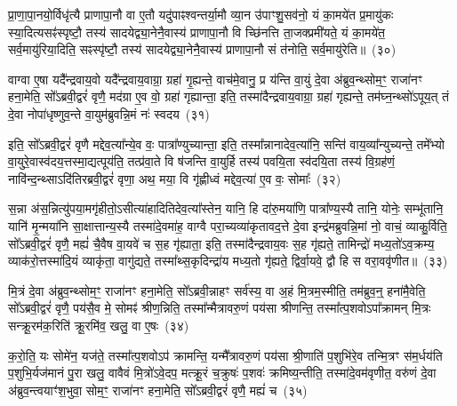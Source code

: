 प्रा॒णा॒पा॒नयो॒र्विधृ॑त्यै प्राणापा॒नौ वा ए॒तौ यदु॑पाꣴश्वन्तर्या॒मौ व्या॒न उ॑पाꣳशु॒सव॑नो॒ यं का॒मये॑त प्र॒मायु॑कः स्या॒दित्यसꣴ॑स्पृष्टौ॒ तस्य॑ सादयेद्व्या॒नेनै॒वास्य॑ प्राणापा॒नौ वि च्छि॑नत्ति ता॒जक्प्रमी॑यते॒ यं का॒मये॑त॒ सर्व॒मायु॑रिया॒दिति॒ सꣴस्पृ॑ष्टौ॒ तस्य॑ सादयेद्व्या॒नेनै॒वास्य॑ प्राणापा॒नौ सं त॑नोति॒ सर्व॒मायु॑रेति॥~(३०)\ip

{\anuvakamend[{त॒ उ॒भया᳚न्गृह्यते॒ चतु॑श्चत्वारिꣳशच्च}]}

वाग्वा ए॒षा यदै᳚न्द्रवाय॒वो यदै᳚न्द्रवाय॒वाग्रा॒ ग्रहा॑ गृ॒ह्यन्ते॒ वाच॑मे॒वानु॒ प्र य॑न्ति वा॒युं दे॒वा अ॑ब्रुव॒न्थ्सोम॒ꣳ॒ राजा॑नꣳ हना॒मेति॒ सो᳚\-ऽब्रवी॒द्वरं॑ वृणै॒ मद॑ग्रा ए॒व वो॒ ग्रहा॑ गृह्यान्ता॒ इति॒ तस्मा॑दैन्द्रवाय॒वाग्रा॒ ग्रहा॑ गृह्यन्ते॒ तम॑घ्न॒न्थ्सो॑\-ऽपूय॒त् तं दे॒वा नोपा॑धृष्णुव॒न्ते वा॒युम॑ब्रुवन्नि॒मं नः॑ स्वदय~(३१)\ip

इति॒ सो᳚\-ऽब्रवी॒द्वरं॑ वृणै मद्देव॒त्या᳚न्ये॒व वः॒ पात्रा᳚ण्युच्यान्ता॒ इति॒ तस्मा᳚न्नानादेव॒त्या॑नि॒ सन्ति॑ वाय॒व्या᳚न्युच्यन्ते॒ तमे᳚भ्यो वा॒युरे॒वास्व॑दय॒त्तस्मा॒द्यत्पूय॑ति॒ तत्प्र॑वा॒ते वि ष॑जन्ति वा॒युर्\mbox{}हि तस्य॑ पवयि॒ता स्व॑दयि॒ता तस्य॑ वि॒ग्रह॑णं॒ नावि॑न्द॒न्थ्सा\-ऽदि॑तिरब्रवी॒द्वरं॑ वृणा॒ अथ॒ मया॒ वि गृ॑ह्णीध्वं मद्देव॒त्या॑ ए॒व वः॒ सोमाः᳚~(३२)\ip

स॒न्ना अ॑स॒न्नित्यु॑पया॒मगृ॑हीतो॒\-ऽसीत्या॑हादितिदेव॒त्या᳚स्तेन॒ यानि॒ हि दा॑रु॒मया॑णि॒ पात्रा᳚ण्य॒स्यै तानि॒ योनेः॒ सम्भू॑तानि॒ यानि॑ मृ॒न्मया॑नि सा॒क्षात्तान्य॒स्यै तस्मा॑दे॒वमा॑ह॒ वाग्वै परा॒च्यव्या॑कृतावद॒त्ते दे॒वा इन्द्र॑मब्रुवन्नि॒मां नो॒ वाचं॒ व्याकु॒र्विति॒ सो᳚\-ऽब्रवी॒द्वरं॑ वृणै॒ मह्यं॑ चै॒वैष वा॒यवे॑ च स॒ह गृ॑ह्याता॒ इति॒ तस्मा॑दैन्द्रवाय॒वः स॒ह गृ॑ह्यते॒ तामिन्द्रो॑ मध्य॒तो॑\-ऽव॒क्रम्य॒ व्याक॑रो॒त्तस्मा॑दि॒यं व्याकृ॑ता॒ वागु॑द्यते॒ तस्मा᳚थ्स॒कृदिन्द्रा॑य मध्य॒तो गृ॑ह्यते॒ द्विर्वा॒यवे॒ द्वौ हि स वरा॒ववृ॑णीत॥~(३३)\ip

{\anuvakamend[{स्व॒द॒य॒ सोमाः᳚ स॒हाष्टाविꣳ॑शतिश्च}]}

मि॒त्रं दे॒वा अ॑ब्रुव॒न्थ्सोम॒ꣳ॒ राजा॑नꣳ हना॒मेति॒ सो᳚\-ऽब्रवी॒न्नाहꣳ सर्व॑स्य॒ वा अ॒हं मि॒त्रम॒स्मीति॒ तम॑ब्रुव॒न्॒ हना॑मै॒वेति॒ सो᳚\-ऽब्रवी॒द्वरं॑ वृणै॒ पय॑सै॒व मे॒ सोमꣴ॑ श्रीण॒न्निति॒ तस्मा᳚न्मैत्रावरु॒णं पय॑सा श्रीणन्ति॒ तस्मा᳚त्प॒शवो\-ऽपा᳚क्रामन् मि॒त्रः सन्क्रू॒रम॑क॒रिति॑ क्रू॒रमि॑व॒ खलु॒ वा ए॒षः~(३४)\ip

क॒रो॒ति॒ यः सोमे॑न॒ यज॑ते॒ तस्मा᳚त्प॒शवो\-ऽप॑ क्रामन्ति॒ यन्मै᳚त्रावरु॒णं पय॑सा श्री॒णाति॑ प॒शुभि॑रे॒व तन्मि॒त्रꣳ स॑म॒र्धय॑ति प॒शुभि॒र्यज॑मानं पु॒रा खलु॒ वावैवं मि॒त्रो॑\-ऽवे॒दप॒ मत्क्रू॒रं च॒क्रुषः॑ प॒शवः॑ क्रमिष्य॒न्तीति॒ तस्मा॑दे॒वम॑वृणीत॒ वरु॑णं दे॒वा अ॑ब्रुव॒न्त्वयाꣳ॑श॒भुवा॒ सोम॒ꣳ॒ राजा॑नꣳ हना॒मेति॒ सो᳚\-ऽब्रवी॒द्वरं॑ वृणै॒ मह्यं॑ च~(३५)\ip

